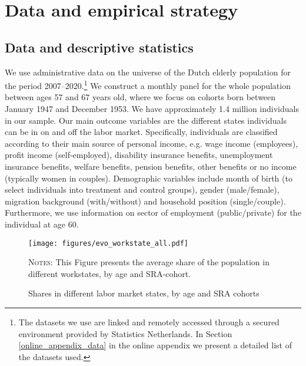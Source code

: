 \documentclass[12pt,a4paper]{article}
\begin{document}
\section{Data and empirical strategy}

\subsection{Data and descriptive statistics}

We use administrative data on the universe of the Dutch elderly population for the period 2007--2020.\footnote{The datasets we use are linked and remotely accessed through a secured environment provided by Statistics Netherlands. In Section \ref{online_appendix_data} in the online appendix we present a detailed list of the datasets used.} We construct a monthly panel for the whole population between ages 57 and 67 years old, where we focus on cohorts born between January 1947 and December 1953. We have approximately 1.4 million individuals in our sample. 
Our main outcome variables are the different states individuals can be in on and off the labor market. Specifically, individuals are classified according to their main source of personal income, e.g. wage income (employees), profit income (self-employed), disability insurance benefits, unemployment insurance benefits, welfare benefits, pension benefits, other benefits or no income (typically women in couples). Demographic  variables include month of birth (to select individuals into treatment and control groups), gender (male/female), migration background (with/without) and household position (single/couple). Furthermore, we use information on sector of employment (public/private) for the individual at age 60.

\begin{figure}[p]
	\begin{adjustwidth}{-1in}{-1in}	
\caption{Shares in different labor market states, by age and SRA cohorts}
\label{workstate}
\centering
\texttt{[image: figures/evo\_workstate\_all.pdf]}
\end{adjustwidth}
\scriptsize
	\begin{minipage}{15cm}%
		\textsc{Notes:}  This Figure presents the average share of the population in different workstates, by age and SRA-cohort. 
	\end{minipage}%
\end{figure}
\end{document}
